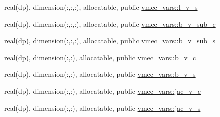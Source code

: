 \begin{DoxyCompactItemize}
\item 
real(dp), dimension(\+:,\+:,\+:), allocatable, public \hyperlink{namespacevmec__vars_a5d1de7879021fa8c1d8c10bbef01f9c7}{vmec\+\_\+vars\+::l\+\_\+v\+\_\+s}
\item 
real(dp), dimension(\+:,\+:,\+:), allocatable, public \hyperlink{namespacevmec__vars_a2e07a2b5bd2384e16e8af8ca4f5b50d6}{vmec\+\_\+vars\+::b\+\_\+v\+\_\+sub\+\_\+c}
\item 
real(dp), dimension(\+:,\+:,\+:), allocatable, public \hyperlink{namespacevmec__vars_aac5e249f0f14cf1e542f881d1777b730}{vmec\+\_\+vars\+::b\+\_\+v\+\_\+sub\+\_\+s}
\item 
real(dp), dimension(\+:,\+:), allocatable, public \hyperlink{namespacevmec__vars_ad6833cc726863147b8fed188d3a28f5d}{vmec\+\_\+vars\+::b\+\_\+v\+\_\+c}
\item 
real(dp), dimension(\+:,\+:), allocatable, public \hyperlink{namespacevmec__vars_ab2aa43fe35401e8f2b7ffb2facad7109}{vmec\+\_\+vars\+::b\+\_\+v\+\_\+s}
\item 
real(dp), dimension(\+:,\+:), allocatable, public \hyperlink{namespacevmec__vars_adcce7c5969ef8c35e8f9673ca0fed8da}{vmec\+\_\+vars\+::jac\+\_\+v\+\_\+c}
\item 
real(dp), dimension(\+:,\+:), allocatable, public \hyperlink{namespacevmec__vars_a633a5542080c02fe2072a6643568562b}{vmec\+\_\+vars\+::jac\+\_\+v\+\_\+s}
\end{DoxyCompactItemize}
